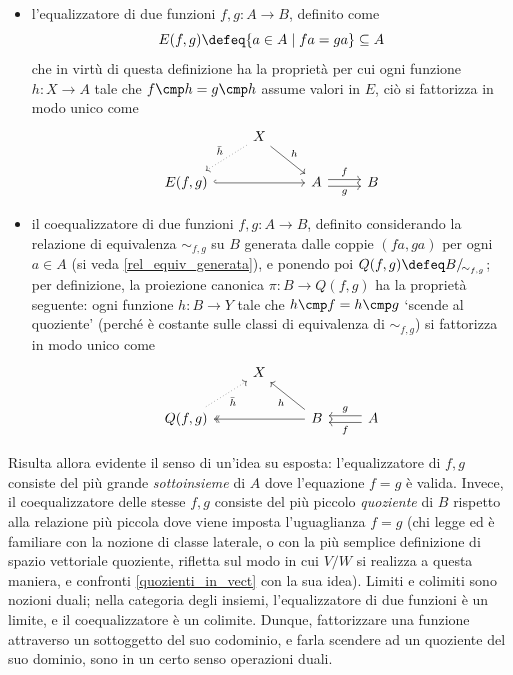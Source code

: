 \begin{itemize}
	\item l'equalizzatore di due funzioni \(f,g \colon A \to B\), definito come
	      \[E(f,g) \defeq  \{ a \in A \mid fa = ga\} \subseteq A\]
	      che in virtù di questa definizione ha la proprietà per cui ogni funzione \(h \colon X \to A\) tale che \(f\cmp h = g\cmp h\) assume valori in \(E\), ciò si fattorizza in modo unico come
	      \[\begin{tikzcd}
			      & X \\
			      {E(f,g)} && A & B
			      \arrow["{\bar h}"', dotted, from=1-2, to=2-1]
			      \arrow["h", from=1-2, to=2-3]
			      \arrow[hook, from=2-1, to=2-3]
			      \arrow["g"', shift right=1, from=2-3, to=2-4]
			      \arrow["f", shift left=1, from=2-3, to=2-4]
		      \end{tikzcd}\]
	\item il coequalizzatore di due funzioni \(f,g \colon A \to B\), definito considerando la relazione di equivalenza \(\sim_{f,g}\) su \(B\) generata dalle coppie \((fa,ga)\) per ogni \(a\in A\) (si veda \ref{rel_equiv_generata}), e ponendo poi \(Q(f,g) \defeq  B/_{\!\sim_{f,g}}\); per definizione, la proiezione canonica \(\pi \colon B \to Q(f,g)\) ha la proprietà seguente: ogni funzione \(h \colon B \to Y\) tale che \(h\cmp f = h\cmp g\) `scende al quoziente' (perché è costante sulle classi di equivalenza di \(\sim_{f,g}\)) si fattorizza in modo unico come
	      \[\begin{tikzcd}
			      & X \\
			      {Q(f,g)} && B & A
			      \arrow["{\bar h}"', dotted, to=1-2, from=2-1]
			      \arrow["h", to=1-2, from=2-3]
			      \arrow[two heads, to=2-1, from=2-3]
			      \arrow["g"', shift right=1, to=2-3, from=2-4]
			      \arrow["f", shift left=1, to=2-3, from=2-4]
		      \end{tikzcd}\]
\end{itemize}
Risulta allora evidente il senso di un'idea su esposta: l'equalizzatore di \(f,g\) consiste del più grande \emph{sottoinsieme} di \(A\) dove l'equazione \(f=g\) è valida. Invece, il coequalizzatore delle stesse \(f,g\) consiste del più piccolo \emph{quoziente} di \(B\) rispetto alla relazione più piccola dove viene imposta l'uguaglianza \(f=g\) (chi legge ed è familiare con la nozione di classe laterale, o con la più semplice definizione di spazio vettoriale quoziente, rifletta sul modo in cui \(V/W\) si realizza a questa maniera, e confronti \ref{quozienti_in_vect} con la sua idea). Limiti e colimiti sono nozioni duali; nella categoria degli insiemi, l'equalizzatore di due funzioni è un limite, e il coequalizzatore è un colimite. Dunque, fattorizzare una funzione attraverso un sottoggetto del suo codominio, e farla scendere ad un quoziente del suo dominio, sono in un certo senso operazioni duali.

